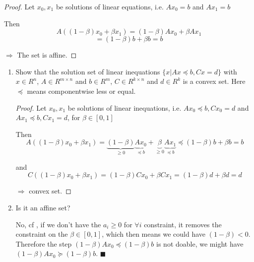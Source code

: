 

\begin{proof}
    Let $x_0, x_1$ be solutions of linear equations, i.e. $A x_0 = b$ and $A x_1 = b$

    Then $$A((1-\beta)x_0 + \beta x_1) = (1-\beta) A x_0 + \beta A x_1$$$$ = (1-\beta)b + \beta b = b$$

    $\Rightarrow$ The set is affine.
\end{proof}



\bigskip
\bigskip
{}

\begin{enumerate}
    \questioncolor
    \item Show that the solution set of linear inequations $\{x | Ax \preceq b, Cx = d\}$ with $x \in R^n$, $A \in R^{m×n}$ and $b \in R^m$, $C \in R^{k×n}$ and $d \in R^k$ is a convex set. Here $\preceq$ means componentwise less or equal. \normalcolor

    \begin{proof}
        Let $x_0, x_1$ be solutions of linear inequations, i.e. $A x_0 \preceq b, C x_0 = d$ and $A x_1 \preceq b, C x_1 = d$, for $\beta \in [0, 1]$

        Then
        \begin{equation}\label{eq:eq1}
            A((1-\beta)x_0 + \beta x_1) = \underbrace{(1-\beta)}_\text{$\ge 0$} \underbrace{A x_0}_\text{$\preceq b$} + \underbrace{\beta}_\text{$\ge 0$} \underbrace{A x_1}_\text{$\preceq b$} \preceq (1-\beta) b + \beta b = b
        \end{equation}

        and $$C((1-\beta) x_0 + \beta x_1) = (1-\beta) C x_0 + \beta C x_1 = (1-\beta) d + \beta d = d$$

        $\Rightarrow$ convex set.
    \end{proof}



    \questioncolor
    \item Is it an affine set? \normalcolor

    No, cf , if we don't have the $a_i \ge 0$ for $\forall i$ constraint, it removes the constraint on the $\beta \in [0,1]$, which then means we could have $(1-\beta) < 0$. Therefore the step $(1-\beta)Ax_0 \preceq (1-\beta)b$ is not doable, we might have $(1-\beta)Ax_0 \succeq (1-\beta)b$. \hfill $\blacksquare$
\end{enumerate}




